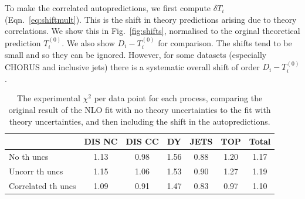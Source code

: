 To make the correlated autopredictions, we first compute $\delta T_i$ (Eqn.~\ref{eq:shiftmult}). This is the shift in theory predictions arising due to theory correlations. We show this in Fig.~\ref{fig:shifts}, normalised to the orginal theoretical prediction $T^{(0)}_i$. We also show $D_i-T_i^{(0)}$ for comparison. The shifts tend to be small and so they can be ignored. However, for some datasets (especially CHORUS and inclusive jets) there is a systematic overall shift of order $D_i-T_i^{(0)}$.

\begin{table}[b!]
\centering
\begin{tabular}{|l||ccccc|c|}
\hline
                   & \textbf{DIS NC} & \textbf{DIS CC} & \textbf{DY} & \textbf{JETS} & \textbf{TOP} & \textbf{Total} \\
                   \hline
No th uncs         & 1.13            & 0.98            & 1.56        & 0.88         & 1.20         & 1.17           \\
Uncorr th uncs     & 1.15            & 1.06            & 1.53        & 0.90         & 1.27         & 1.19           \\
Correlated th uncs & 1.09            & 0.91           & 1.47        & 0.83         & 0.97        & 1.10    \\
\hline
\end{tabular}
\vspace{1cm}
\caption{The experimental $\chi^2$ per data point for each process, comparing the original result of the NLO fit with no theory uncertainties to the fit with theory uncertainties, and then including the shift in the autopredictions.}
  \label{tab:chisq}
\end{table}

